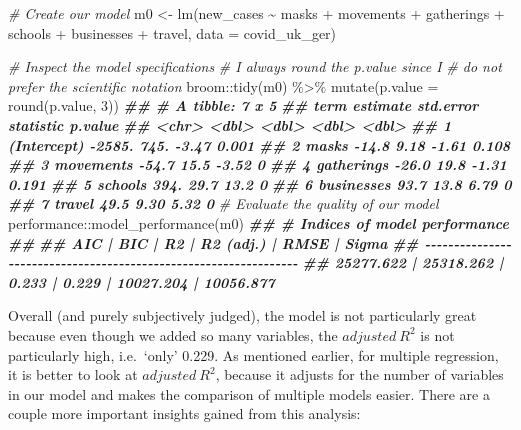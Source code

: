 \documentclass[
]{book}
\newenvironment{Shaded}{\begin{snugshade}}{\end{snugshade}}
\newcommand{\AttributeTok}[1]{\textcolor[rgb]{0.77,0.63,0.00}{#1}}
\newcommand{\CommentTok}[1]{\textcolor[rgb]{0.56,0.35,0.01}{\textit{#1}}}
\newcommand{\DecValTok}[1]{\textcolor[rgb]{0.00,0.00,0.81}{#1}}
\newcommand{\DocumentationTok}[1]{\textcolor[rgb]{0.56,0.35,0.01}{\textbf{\textit{#1}}}}
\newcommand{\FunctionTok}[1]{\textcolor[rgb]{0.00,0.00,0.00}{#1}}
\newcommand{\NormalTok}[1]{#1}
\newcommand{\OtherTok}[1]{\textcolor[rgb]{0.56,0.35,0.01}{#1}}
\newcommand{\SpecialCharTok}[1]{\textcolor[rgb]{0.00,0.00,0.00}{#1}}
\begin{document}
\begin{Shaded}
\begin{Highlighting}[]
\CommentTok{\# Create our model}
\NormalTok{m0 }\OtherTok{\textless{}{-}} \FunctionTok{lm}\NormalTok{(new\_cases }\SpecialCharTok{\textasciitilde{}}\NormalTok{ masks }\SpecialCharTok{+}\NormalTok{ movements }\SpecialCharTok{+}\NormalTok{ gatherings }\SpecialCharTok{+}\NormalTok{ schools }\SpecialCharTok{+}\NormalTok{ businesses }\SpecialCharTok{+}\NormalTok{ travel,}
         \AttributeTok{data =}\NormalTok{ covid\_uk\_ger)}

\CommentTok{\# Inspect the model specifications}
\CommentTok{\# I always round the p.value since I}
\CommentTok{\# do not prefer the scientific notation}
\NormalTok{broom}\SpecialCharTok{::}\FunctionTok{tidy}\NormalTok{(m0) }\SpecialCharTok{\%\textgreater{}\%}
  \FunctionTok{mutate}\NormalTok{(}\AttributeTok{p.value =} \FunctionTok{round}\NormalTok{(p.value, }\DecValTok{3}\NormalTok{))}
\DocumentationTok{\#\# \# A tibble: 7 x 5}
\DocumentationTok{\#\#   term        estimate std.error statistic p.value}
\DocumentationTok{\#\#   \textless{}chr\textgreater{}          \textless{}dbl\textgreater{}     \textless{}dbl\textgreater{}     \textless{}dbl\textgreater{}   \textless{}dbl\textgreater{}}
\DocumentationTok{\#\# 1 (Intercept)  {-}2585.     745.       {-}3.47   0.001}
\DocumentationTok{\#\# 2 masks          {-}14.8      9.18     {-}1.61   0.108}
\DocumentationTok{\#\# 3 movements      {-}54.7     15.5      {-}3.52   0    }
\DocumentationTok{\#\# 4 gatherings     {-}26.0     19.8      {-}1.31   0.191}
\DocumentationTok{\#\# 5 schools        394.      29.7      13.2    0    }
\DocumentationTok{\#\# 6 businesses      93.7     13.8       6.79   0    }
\DocumentationTok{\#\# 7 travel          49.5      9.30      5.32   0}
\CommentTok{\# Evaluate the quality of our model}
\NormalTok{performance}\SpecialCharTok{::}\FunctionTok{model\_performance}\NormalTok{(m0)}
\DocumentationTok{\#\# \# Indices of model performance}
\DocumentationTok{\#\# }
\DocumentationTok{\#\# AIC       |       BIC |    R2 | R2 (adj.) |      RMSE |     Sigma}
\DocumentationTok{\#\# {-}{-}{-}{-}{-}{-}{-}{-}{-}{-}{-}{-}{-}{-}{-}{-}{-}{-}{-}{-}{-}{-}{-}{-}{-}{-}{-}{-}{-}{-}{-}{-}{-}{-}{-}{-}{-}{-}{-}{-}{-}{-}{-}{-}{-}{-}{-}{-}{-}{-}{-}{-}{-}{-}{-}{-}{-}{-}{-}{-}{-}{-}{-}{-}{-}}
\DocumentationTok{\#\# 25277.622 | 25318.262 | 0.233 |     0.229 | 10027.204 | 10056.877}
\end{Highlighting}
\end{Shaded}

Overall (and purely subjectively judged), the model is not particularly great because even though we added so many variables, the \(adjusted \ R^2\) is not particularly high, i.e.~`only' 0.229. As mentioned earlier, for multiple regression, it is better to look at \(adjusted \ R^2\), because it adjusts for the number of variables in our model and makes the comparison of multiple models easier. There are a couple more important insights gained from this analysis:
\end{document}
